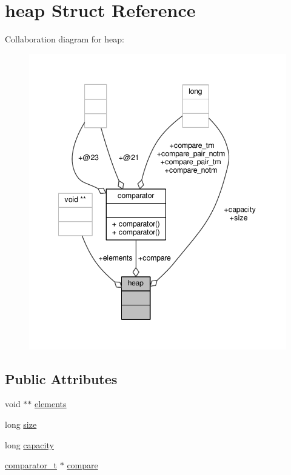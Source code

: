 \hypertarget{structheap}{\section{heap Struct Reference}
\label{structheap}
}


Collaboration diagram for heap\-:
\nopagebreak
\begin{figure}[H]
\begin{center}
\leavevmode
\includegraphics[width=344pt]{structheap__coll__graph}
\end{center}
\end{figure}
\subsection*{Public Attributes}
\begin{DoxyCompactItemize}
\item 
void $\ast$$\ast$ \hyperlink{structheap_a77bfb4715fa5fdeb209cb3170023723e}{elements}
\item 
long \hyperlink{structheap_ac993596e66a66fe5fb11304ec781f8eb}{size}
\item 
long \hyperlink{structheap_a305bf428a6dde4af0892158224bcf384}{capacity}
\item 
\hyperlink{lehigh_8h_a493abab632f5cea71ed0baaef40590aa}{comparator\-\_\-t} $\ast$ \hyperlink{structheap_a721a775958a330f128dbc7336b0750d3}{compare}
\end{DoxyCompactItemize}


